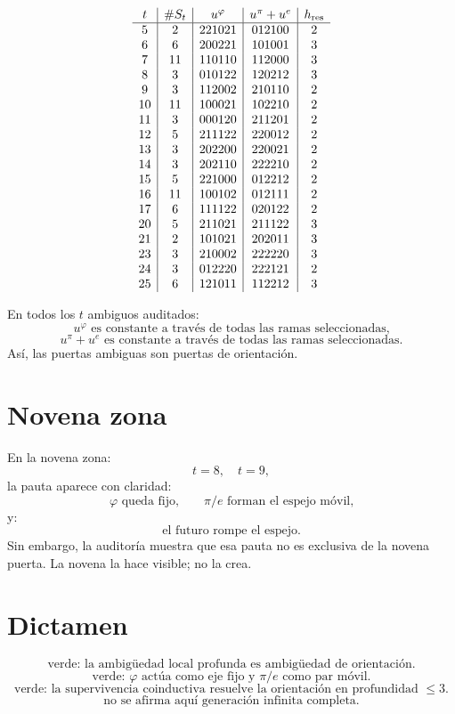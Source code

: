 \documentclass[11pt,a4paper]{article}
\begin{document}
\[
\begin{array}{c|c|c|c|c}
t&\#S_t&u^\varphi&u^\pi+u^e&h_{\rm res}\\
\hline
5 & 2 & 221021 & 012100 & 2 \\
6 & 6 & 200221 & 101001 & 3 \\
7 & 11 & 110110 & 112000 & 3 \\
8 & 3 & 010122 & 120212 & 3 \\
9 & 3 & 112002 & 210110 & 2 \\
10 & 11 & 100021 & 102210 & 2 \\
11 & 3 & 000120 & 211201 & 2 \\
12 & 5 & 211122 & 220012 & 2 \\
13 & 3 & 202200 & 220021 & 2 \\
14 & 3 & 202110 & 222210 & 2 \\
15 & 5 & 221000 & 012212 & 2 \\
16 & 11 & 100102 & 012111 & 2 \\
17 & 6 & 111122 & 020122 & 2 \\
20 & 5 & 211021 & 211122 & 3 \\
21 & 2 & 101021 & 202011 & 3 \\
23 & 3 & 210002 & 222220 & 3 \\
24 & 3 & 012220 & 222121 & 2 \\
25 & 6 & 121011 & 112212 & 3 \\
\end{array}
\]

En todos los \(t\) ambiguos auditados:
\[
\boxed{
u^\varphi\text{ es constante a través de todas las ramas seleccionadas,}
}
\]
\[
\boxed{
u^\pi+u^e\text{ es constante a través de todas las ramas seleccionadas.}
}
\]
Así, las puertas ambiguas son puertas de orientación.

\section{Novena zona}

En la novena zona:
\[
t=8,\quad t=9,
\]
la pauta aparece con claridad:
\[
\varphi\text{ queda fijo,}
\qquad
\pi/e\text{ forman el espejo móvil,}
\]
y:
\[
\text{el futuro rompe el espejo.}
\]
Sin embargo, la auditoría muestra que esa pauta no es exclusiva de la novena puerta. La novena la hace visible; no la crea.

\section{Dictamen}

\[
\boxed{
\text{verde: la ambigüedad local profunda es ambigüedad de orientación.}
}
\]
\[
\boxed{
\text{verde: }\varphi\text{ actúa como eje fijo y }\pi/e\text{ como par móvil.}
}
\]
\[
\boxed{
\text{verde: la supervivencia coinductiva resuelve la orientación en profundidad }\le3.
}
\]
\[
\boxed{
\text{no se afirma aquí generación infinita completa.}
}
\]
\end{document}
